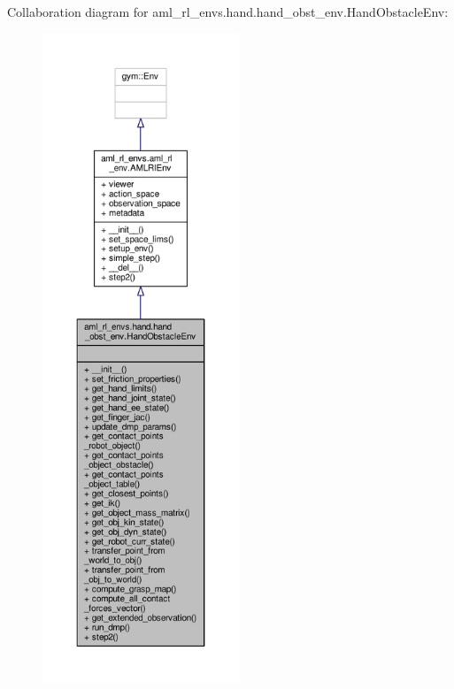 Collaboration diagram for aml\-\_\-rl\-\_\-envs.\-hand.\-hand\-\_\-obst\-\_\-env.\-Hand\-Obstacle\-Env\-:
\nopagebreak
\begin{figure}[H]
\begin{center}
\leavevmode
\includegraphics[height=550pt]{classaml__rl__envs_1_1hand_1_1hand__obst__env_1_1_hand_obstacle_env__coll__graph}
\end{center}
\end{figure}
